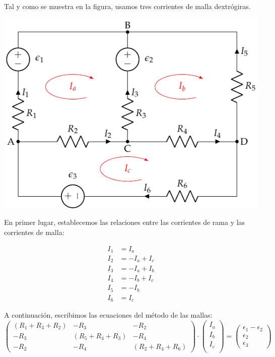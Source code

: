\documentclass[10pt]{article}
\begin{document}
Tal y como se muestra en la figura, usamos tres corrientes de malla dextrógiras. 

  \includegraphics{../figs/mallas1_corrientes.pdf}

En primer lugar, establecemos las relaciones entre las corrientes de rama y las corrientes de malla:

\begin{align*}
  I_1 &= I_a\\
  I_2 &= -I_a + I_c\\
  I_3 &= -I_a + I_b\\
  I_4 &= -I_b + I_c\\
  I_5 &= -I_b\\
  I_6 &= I_c
\end{align*}

A continuación, escribimos las ecuaciones del método de las mallas:
\begin{equation*}
  \begin{pmatrix}
    (R_1 + R_3 + R_2) &  - R_3 & - R_2 \\
    - R_3 & (R_5 + R_4 + R_3) & - R_4 \\
    - R_2 & - R_4 &  (R_2 + R_4 + R_6)
  \end{pmatrix} \cdot %
  \begin{pmatrix}
    I_a\\
    I_b\\
    I_c\\
  \end{pmatrix} = %
  \begin{pmatrix}
    \epsilon_1 - \epsilon_2\\
    \epsilon_2\\
    \epsilon_3
  \end{pmatrix}
\end{equation*}
\end{document}
